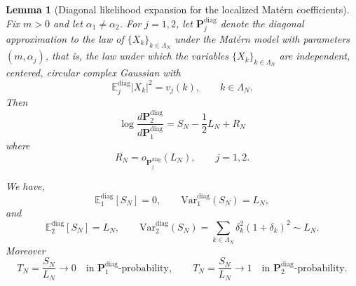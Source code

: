 \documentclass[10pt,a4paper]{amsart}
\newtheorem{lemma}{Lemma}
\newcommand{\E}{\mathbb{E}}
\newcommand{\Var}{\mathrm{Var}}
\begin{document}
\begin{lemma}[Diagonal likelihood expansion for the localized Mat\'ern coefficients]
\label{lem:matdiag}
Fix \(m>0\) and let \(\alpha_1\neq \alpha_2\). For \(j=1,2\), let \(\mathbf P_j^{\mathrm{diag}}\) denote the diagonal approximation
to the law of \(\{X_k\}_{k\in\Lambda_N}\) under the Mat\'ern model with parameters
\((m,\alpha_j)\), that is, the law under which the variables
\(\{X_k\}_{k\in\Lambda_N}\) are independent, centered, circular complex Gaussian with
\[
\E_j^{\mathrm{diag}} |X_k|^2 = v_j(k), \qquad k\in\Lambda_N.
\]
Then
\begin{equation}\label{eq:matern-diagonal-llr}
\log\frac{d\mathbf P_2^{\mathrm{diag}}}{d\mathbf P_1^{\mathrm{diag}}}
=
S_N-\frac12L_N+R_N
\end{equation}
where
\[
R_N=o_{\mathbf P_j^{\mathrm{diag}}}(L_N), \qquad j=1,2.
\]

We have,
\[
\E_1^{\mathrm{diag}}[S_N]=0,
\qquad
\Var_1^{\mathrm{diag}}(S_N)=L_N,
\]
and
\[
\E_2^{\mathrm{diag}}[S_N]=L_N,
\qquad
\Var_2^{\mathrm{diag}}(S_N)
=
\sum_{k\in\Lambda_N}\delta_k^2(1+\delta_k)^2 \sim L_N.
\]
Moreover
\[
T_N=\frac{S_N}{L_N}\to 0
\quad\text{in \(\mathbf P_1^{\mathrm{diag}}\)-probability},
\qquad
T_N=\frac{S_N}{L_N}\to 1
\quad\text{in \(\mathbf P_2^{\mathrm{diag}}\)-probability}.
\]
\end{lemma}
\end{document}
